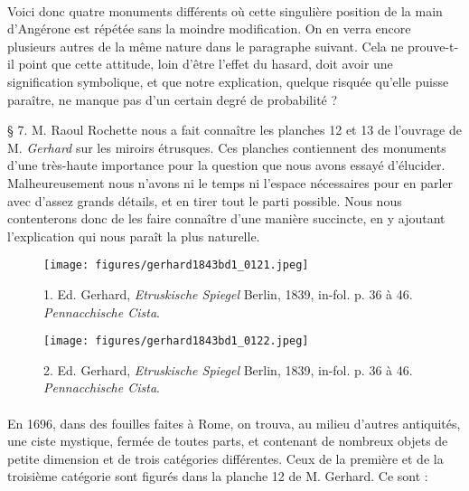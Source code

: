 \documentclass[a4paper, 11pt, oneside, polutonikogreek, french]{article}
\begin{document}
\paragraph{}
Voici donc quatre monuments différents où cette singulière position de la main d'Angérone est répétée sans la moindre modification. On en verra encore plusieurs autres de la même nature dans le paragraphe suivant. Cela ne prouve-t-il point que cette attitude, loin d'être l'effet du hasard, doit avoir une signification symbolique, et que notre explication, quelque risquée qu'elle puisse paraître, ne manque pas d'un certain degré de probabilité ?

§ 7. M. Raoul Rochette nous a fait connaître les planches 12 et 13 de l'ouvrage de M. \emph{Gerhard} sur les miroirs étrusques. Ces planches contiennent des monuments d'une très-haute importance pour la question que nous avons essayé d'élucider. Malheureusement nous n'avons ni le temps ni l'espace nécessaires pour en parler avec d'assez grands détails, et en tirer tout le parti possible. Nous nous contenterons donc de les faire connaître d'une manière succincte, en y ajoutant l'explication qui nous paraît la plus naturelle.
\clearpage
\vspace*{\fill}
\begin{figure}[H]
\centering
\texttt{[image: figures/gerhard1843bd1\_0121.jpeg]}
\caption{1. Ed. Gerhard, \emph{Etruskische Spiegel} Berlin, 1839, in-fol. p. 36 à 46. \emph{Pennacchische Cista}.}
\end{figure}
\vspace*{\fill}
\clearpage
\vspace*{\fill}
\begin{figure}[H]
\centering
\texttt{[image: figures/gerhard1843bd1\_0122.jpeg]}
\caption{2. Ed. Gerhard, \emph{Etruskische Spiegel} Berlin, 1839, in-fol. p. 36 à 46. \emph{Pennacchische Cista}.}
\end{figure}
\vspace*{\fill}
\paragraph{}
En 1696, dans des fouilles faites à Rome, on trouva, au milieu d'autres antiquités, une ciste mystique, fermée de toutes parts, et contenant de nombreux objets de petite dimension et de trois catégories différentes. Ceux de la première et de la troisième catégorie sont figurés dans la planche 12 de M. Gerhard. Ce sont :
\end{document}
